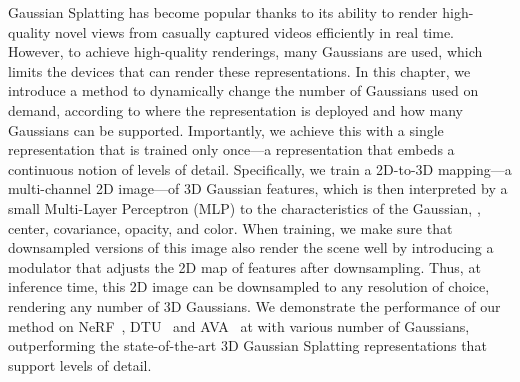 \label{sec:clog-abstract}
Gaussian Splatting has become popular thanks to its ability to render
high-quality novel views from casually captured videos efficiently in real
time.
However, to achieve high-quality renderings, many Gaussians are used, which
limits the devices that can render these representations.
In this chapter, we introduce a method to dynamically change the number of
Gaussians used on demand, according to where the representation is deployed
and how many Gaussians can be supported.
Importantly, we achieve this with a single representation that is trained only
once---a representation that embeds a continuous notion of levels of detail.
Specifically, we train a 2D-to-3D mapping---a multi-channel 2D image---of 3D
Gaussian features, which is then interpreted by a small Multi-Layer Perceptron
(MLP) to the characteristics of the Gaussian, \ie, center, covariance,
opacity, and color.
When training, we make sure that downsampled versions of this image also
render the scene well by introducing a modulator that adjusts the 2D map of
features after downsampling.
Thus, at inference time, this 2D image can be downsampled to any resolution of
choice, rendering any number of 3D Gaussians.
We demonstrate the performance of our method on
NeRF~\cite{mildenhall2020nerf}, DTU~\cite{aanaes2016large} and
AVA~\cite{martinez2024codec} at with various number of Gaussians,
outperforming the state-of-the-art 3D Gaussian Splatting representations that
support levels of detail.
